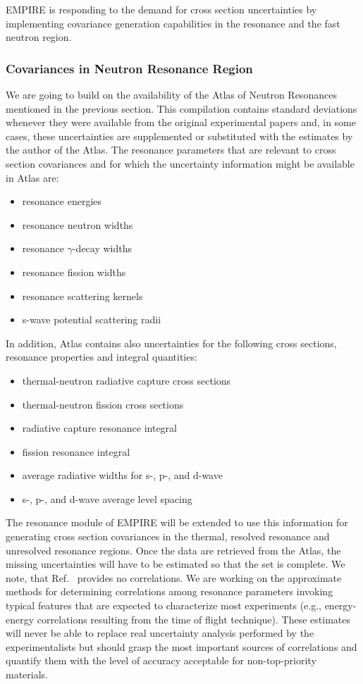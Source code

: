 \documentclass[twocolumn,amsmath,amssymb,10pt,groupedaddress,a4paper]{revtex4}
\begin{document}
EMPIRE is responding to the demand for cross section uncertainties by implementing covariance generation capabilities in the resonance and the fast neutron region.

\subsubsection{Covariances in Neutron Resonance Region}
We are going to build on the availability of the Atlas of Neutron Resonances~\cite{Mughabghab:06} mentioned in the previous section. This compilation contains standard deviations whenever they were available from the original experimental papers and,  in some cases, these uncertainties are supplemented or substituted with the estimates by the author of the Atlas. The resonance parameters that are relevant to cross section covariances and for which the uncertainty information might be available in Atlas are:
\begin{itemize}
\item resonance energies
\item resonance neutron widths
\item resonance $\gamma$-decay widths
\item resonance fission widths
\item resonance scattering kernels
\item s-wave potential scattering radii
\end{itemize}
In addition, Atlas contains also uncertainties for the following cross sections, resonance properties and integral quantities:
\begin{itemize}
\item thermal-neutron radiative capture cross sections
\item thermal-neutron fission cross sections
\item radiative capture resonance integral
\item fission resonance integral
\item average radiative widths for s-, p-, and d-wave
\item  s-, p-, and d-wave average level spacing
\end{itemize}

The resonance module of EMPIRE will be extended to use this information for generating cross section covariances in the thermal, resolved resonance and unresolved resonance regions. Once the data are retrieved from the Atlas, the missing uncertainties will have to be estimated so that the set is complete. We note, that Ref.~\cite{Mughabghab:06} provides no correlations. We are working on the approximate methods for determining correlations among resonance parameters invoking typical features that are expected to characterize most experiments (e.g., energy-energy correlations resulting from the time of flight technique). These estimates will never be able to replace real uncertainty analysis performed by the experimentalists but should grasp the most important sources of correlations and quantify them with the level of accuracy acceptable for non-top-priority materials.
\end{document}
